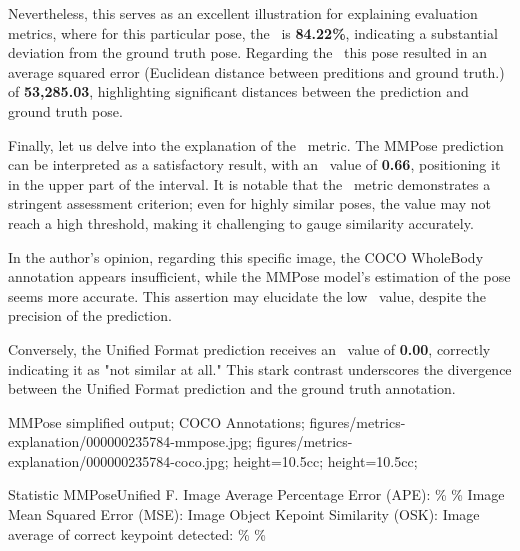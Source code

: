 Nevertheless, this serves as an excellent illustration for explaining evaluation metrics, where for this particular pose, the \APE\ is {\bf 84.22\%}, indicating a substantial deviation from the ground truth pose. Regarding the \MSE\, this pose resulted in an average squared error (Euclidean distance between preditions and ground truth.) of {\bf 53,285.03}, highlighting significant distances between the prediction and ground truth pose.

Finally, let us delve into the explanation of the \OKS\ metric. The MMPose prediction can be interpreted as a satisfactory result, with an \OKS\ value of {\bf 0.66}, positioning it in the upper part of the interval. It is notable that the \OKS\ metric demonstrates a stringent assessment criterion; even for highly similar poses, the value may not reach a high threshold, making it challenging to gauge similarity accurately.

In the author's opinion, regarding this specific image, the COCO WholeBody annotation appears insufficient, while the MMPose model's estimation of the pose seems more accurate. This assertion may elucidate the low \OKS\ value, despite the precision of the prediction.

Conversely, the Unified Format prediction receives an \OKS\ value of {\bf 0.00}, correctly indicating it as "not similar at all." This stark contrast underscores the divergence between the Unified Format prediction and the ground truth annotation.

    {
        MMPose simplified output;
        COCO Annotations;
    }
    {
        figures/metrics-explanation/000000235784-mmpose.jpg;
        figures/metrics-explanation/000000235784-coco.jpg;
    }
    {
        height=10.5cc;
        height=10.5cc;
    }


    \setupTABLE[r][1][style=bold]
    \setupTABLE[c][each][offset=3dd]
    \setupTABLE[frame=off]
    \setupTABLE[r][1][topframe=on,bottomframe=on]
    \setupTABLE[c][each][leftframe=on]
    \setupTABLE[c][1][leftframe=off]
    \setupTABLE[c][2,3][align=middle]
    \bTR\bTD Statistic                                   \eTD\bTD    MMPose\eTD\bTD     Unified F.\eTD\eTR
    \bTR\bTD Image Average Percentage Error (APE):       \eTD{}\% \eTD{}\% \eTD\eTR
    \bTR\bTD Image Mean Squared Error (MSE):             \eTD{} \eTD{} \eTD\eTR
    \bTR\bTD Image Object Kepoint Similarity (OSK):      \eTD{} \eTD{} \eTD\eTR
    \bTR\bTD Image average of correct keypoint detected: \eTD{}\% \eTD{}\% \eTD\eTR


